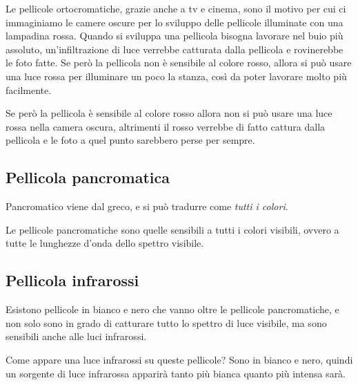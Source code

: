 Le pellicole ortocromatiche, grazie anche a tv e cinema, sono il motivo per cui ci immaginiamo le camere oscure per lo sviluppo delle pellicole illuminate con una lampadina rossa.
Quando si sviluppa una pellicola bisogna lavorare nel buio più assoluto, un'infiltrazione di luce verrebbe catturata dalla pellicola e rovinerebbe le foto fatte.
Se però la pellicola  non è sensibile al colore rosso, allora si può usare una luce rossa per illuminare un poco la stanza, così da poter lavorare molto più facilmente.

Se però la pellicola è sensibile al colore rosso allora non si può usare una luce rossa nella camera oscura, altrimenti il rosso verrebbe di fatto cattura dalla pellicola e le foto a quel punto sarebbero perse per sempre.


\subsection{Pellicola pancromatica} \label{subsec:pellicolapan}
Pancromatico viene dal greco, e si può tradurre come \textit{tutti i colori}.

Le pellicole pancromatiche sono quelle sensibili a tutti i colori visibili, ovvero a tutte le lunghezze d'onda dello spettro visibile.


\subsection{Pellicola infrarossi} \label{subsec:pellicolair}
Esistono pellicole in bianco e nero che vanno oltre le pellicole pancromatiche, e non solo sono in grado di catturare tutto lo spettro di luce visibile, ma sono sensibili anche alle luci infrarossi.

Come appare una luce infrarossi su queste pellicole? Sono in bianco e nero, quindi un sorgente di luce infrarossa apparirà tanto più bianca quanto più intensa sarà.